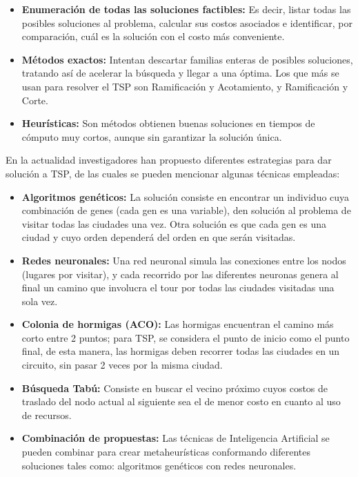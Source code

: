 \begin{itemize}
    \item \textbf{Enumeración de todas las soluciones factibles:} Es decir, listar todas las posibles soluciones al problema, calcular sus costos asociados e identificar, por comparación, cuál es la solución con el costo más conveniente.
 \item \textbf{Métodos exactos:} Intentan descartar familias enteras de posibles soluciones, tratando así de acelerar la búsqueda y llegar a una óptima. Los que más se usan para resolver el TSP son Ramificación y Acotamiento, y Ramificación y Corte.
 \item \textbf{Heurísticas:} Son métodos obtienen buenas soluciones en tiempos de cómputo muy cortos, aunque sin garantizar la solución única.
\end{itemize}

\hspace*{1cm}En la actualidad investigadores han propuesto diferentes estrategias para dar solución a TSP, de las cuales se pueden mencionar algunas técnicas empleadas:

\begin{itemize}
\item \textbf{Algoritmos genéticos:} La solución consiste en encontrar un individuo cuya combinación de genes (cada gen es una variable), den solución al problema de visitar todas las ciudades una vez. Otra solución es que cada gen es una ciudad y cuyo orden dependerá del orden en que serán visitadas.
\item \textbf{Redes neuronales:} Una red neuronal simula las conexiones entre los nodos (lugares por visitar), y cada recorrido por las diferentes neuronas genera al final un camino que involucra el tour por todas las ciudades visitadas una sola vez.
\item \textbf{Colonia de hormigas (ACO):} Las hormigas encuentran el camino más corto entre 2 puntos; para TSP, se considera el punto de inicio como el punto final, de esta manera, las hormigas deben recorrer todas las ciudades en un circuito, sin pasar 2 veces por la misma ciudad.
\item \textbf{Búsqueda Tabú:} Consiste en buscar el vecino próximo cuyos costos de traslado del nodo actual al siguiente sea el de menor costo en cuanto al uso de recursos.
\item \textbf{Combinación de propuestas:} Las técnicas de Inteligencia Artificial se pueden combinar para crear metaheurísticas conformando diferentes soluciones tales como: algoritmos genéticos con redes neuronales.
\end{itemize}

